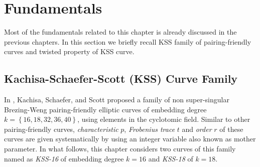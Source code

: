 %
%

\section{Fundamentals}
Most of the fundamentals related to this chapter is already discussed in the previous chapters.
In this section we briefly recall KSS family of pairing-friendly curves and twisted property of KSS curve.

\subsection{Kachisa-Schaefer-Scott (KSS) Curve Family}
 In \cite{EPRINT:KacSchSco07}, Kachisa, Schaefer, and Scott proposed a family of non super-singular Brezing-Weng pairing-friendly elliptic curves of embedding degree $k = \left\lbrace16, 18, 32, 36, 40\right\rbrace$, using elements in the cyclotomic field. Similar to other pairing-friendly curves,  \textit{characteristic} $p$, \textit{Frobenius trace} $t$ and \textit{order} $r$ of these curves are given systematically by using an integer variable also known as mother parameter. In what follows, this chapter considers two curves of this family named as \textit{KSS-16} of embedding degree $k =16$  and \textit{KSS-18} of $k=18$. 

